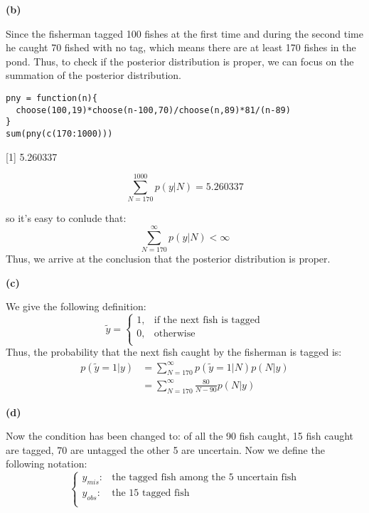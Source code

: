 \documentclass[letterpaper,11pt]{article}
\begin{document}
\begin{addmargin}[-1.1em]{0em} \textbf{(b)}\par \end{addmargin}

Since the fisherman tagged 100 fishes at the first time and during the second time he caught 70 fished with no tag, which means there are at least 170 fishes in the pond. Thus, to check if the posterior distribution is proper, we can focus on the summation of the posterior distribution.

\begin{lstlisting}
pny = function(n){
  choose(100,19)*choose(n-100,70)/choose(n,89)*81/(n-89)
}
sum(pny(c(170:1000)))
\end{lstlisting}
[1] 5.260337


$$\sum_{N=170}^{1000}p(y\vert N) = 5.260337$$


so it's easy to conlude that:
$$\sum_{N=170}^{\infty}p(y\vert N) < \infty$$
Thus, we arrive at the conclusion that the posterior distribution is proper.

\begin{addmargin}[-1.1em]{0em} \textbf{(c)}\par \end{addmargin}
We give the following definition:
$$\tilde{y} = \begin{cases}
1, & \text{if the next fish is tagged}\\
0, & \text{otherwise}\\
\end{cases}$$
Thus, the probability that the next fish caught by the fisherman is tagged is:
\begin{align}
	p(\tilde{y}=1\vert y) &= \sum_{N=170}^{\infty}p(\tilde{y}=1\vert N)p(N\vert y)\nonumber\\
	&= \sum_{N=170}^{\infty}\frac{80}{N-90}p(N\vert y)\nonumber
\end{align}


\begin{addmargin}[-1.1em]{0em} \textbf{(d)}\par \end{addmargin}

Now the condition has been changed to: of all the 90 fish caught, 15 fish caught are tagged, 70 are untagged the other 5 are uncertain.
Now we define the following notation:
 $$\begin{cases}
y_{mis}: &\text{the tagged fish among the 5 uncertain fish}\\
y_{obs}: & \text{the 15 tagged fish}\\
\end{cases}$$
\end{document}
